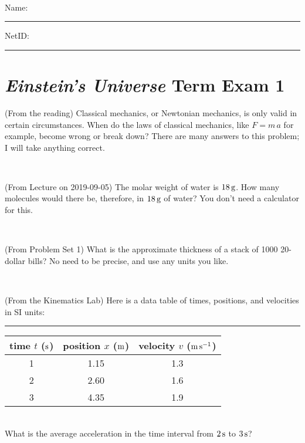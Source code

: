 \documentclass[12pt, letterpaper]{article}
\begin{document}
\vfill ~


\cleardoublepage



\noindent
Name: \rule[-1ex]{0.60\textwidth}{0.1pt}
NetID: \rule[-1ex]{0.20\textwidth}{0.1pt}

\section*{\textsl{Einstein's Universe} Term Exam 1}
\setcounter{problem}{1}


\begin{problem} (From the reading)
Classical mechanics, or Newtonian mechanics, is only valid in certain
circumstances. When do the laws of classical mechanics, like $F =
m\,a$ for example, become wrong or break down? There are many answers
to this problem; I will take anything correct.
\end{problem}


\vfill ~

\begin{problem} (From Lecture on 2019-09-05)
The molar weight of water is $18\,\mathrm{g}$. How many molecules would there
be, therefore, in $18\,\mathrm{g}$ of water? You don't need a calculator for
this.
\end{problem}


\vfill ~

\begin{problem} (From Problem Set 1)
What is the approximate thickness of a stack of 1000 20-dollar bills?
No need to be precise, and use any units you like.
\end{problem}


\vfill ~

\begin{problem} (From the Kinematics Lab)
Here is a data table of times, positions, and velocities in SI units:\\
\rule{1.0in}{0pt}\begin{tabular}{c|c|c}
time $t$ ($\mathrm{s}$) & position $x$ ($\mathrm{m}$) & velocity $v$ ($\mathrm{m}\,\mathrm{s}^{-1}$) \\
\hline
1 & 1.15 & 1.3 \\
2 & 2.60 & 1.6 \\
3 & 4.35 & 1.9 \\
\hline
\end{tabular}\\
What is the average acceleration in the time interval from $2\,\mathrm{s}$ to $3\,\mathrm{s}$?
\end{problem}
\end{document}
